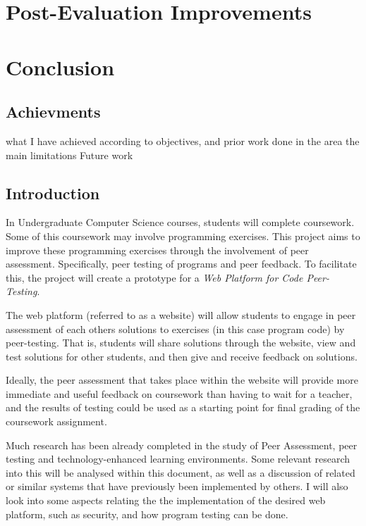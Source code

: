 \documentclass[a4paper,11pt]{report}
\begin{document}
\chapter{Post-Evaluation Improvements}

\chapter{Conclusion}
\section{Achievments}
what I have achieved according to objectives, and prior work done in the area
the main limitations
Future work






\section{Introduction}
In Undergraduate Computer Science courses, students will complete coursework. Some of this coursework may involve programming exercises. This project aims to improve these programming exercises through the involvement of peer assessment. Specifically, peer testing of programs and peer feedback. To facilitate this, the project will create a prototype for a \textit{Web Platform for Code Peer-Testing}.\par
The web platform (referred to as a website) will allow students to engage in peer assessment of each others solutions to exercises (in this case program code) by peer-testing. That is, students will share solutions through the website, view and test solutions for other students, and then give and receive feedback on solutions.\par
Ideally, the peer assessment that takes place within the website will provide more immediate and useful feedback on coursework than having to wait for a teacher, and the results of testing could be used as a starting point for final grading of the coursework assignment.\par

Much research has been already completed in the study of Peer Assessment, peer testing and technology-enhanced learning environments. Some relevant research into this will be analysed within this document, as well as a discussion of related or similar systems that have previously been implemented by others. I will also look into some aspects relating the the implementation of the desired web platform, such as security, and how program testing can be done.\par
\end{document}
